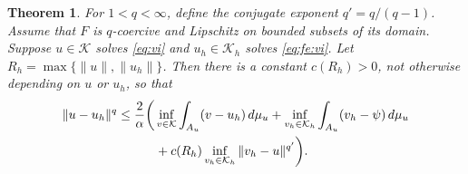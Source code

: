\documentclass[]{interact}
\theoremstyle{plain}%
\newtheorem{theorem}{Theorem}[section]
\theoremstyle{definition}
\theoremstyle{remark}
\newcommand{\cK}{\mathcal{K}}
\begin{document}
\begin{theorem} \label{thm:genfalk}  For $1<q<\infty$, define the conjugate exponent $q'=q/(q-1)$.  Assume that $F$ is $q$-coercive and Lipschitz on bounded subsets of its domain.  Suppose $u\in\cK$ solves \eqref{eq:vi} and $u_h\in\cK_h$ solves \eqref{eq:fe:vi}.  Let $R_h=\max\{\|u\|,\|u_h\|\}$.  Then there is a constant $c(R_h)>0$, not otherwise depending on $u$ or $u_h$, so that
\begin{align}
\|u-u_h\|^q &\le \frac{2}{\alpha} \bigg( \inf_{v\in\cK} \int_{A_u} (v-u_h)\,d\mu_u + \inf_{v_h\in\cK_h} \int_{A_u} (v_h-\psi)\,d\mu_u  \label{eq:falk} \\
   &\qquad\quad + c(R_h) \inf_{v_h\in\cK_h} \|v_h - u\|^{q'}\bigg). \notag
\end{align}
\end{theorem}
\end{document}
